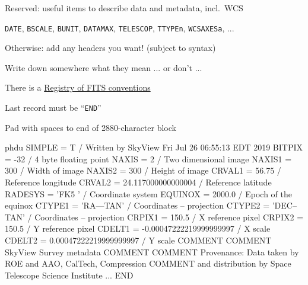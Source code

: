 \documentclass[20pt,landscape]{foils}
\newcommand{\bhref}[2]{\href{#1}{{\color{blue}#2}}}
\begin{document}
\begin{list0}
\begin{list2big}
\begin{list3}
      \item Reserved: useful items to describe data and metadata, incl.\ WCS
      \begin{list4}
        \item[] {\color{brown}\tt DATE},
                {\color{brown}\tt BSCALE},
                {\color{brown}\tt BUNIT},
                {\color{brown}\tt DATAMAX},
                {\color{brown}\tt TELESCOP},
                {\color{brown}\tt TTYPEn},
                {\color{brown}\tt WCSAXESa}, ...
\vspace*{-0.15cm}
      \end{list4}
      \item Otherwise: add any headers you want! (subject to syntax)
      \begin{list4}
        \item Write down somewhere what they mean ... or don't ...
        \item There is a
              \bhref{https://fits.gsfc.nasa.gov/fits_conventions.html}
                    {Registry of FITS conventions}
\vspace*{-0.15cm}
      \end{list4}
\vspace*{-0.15cm}
    \end{list3}
\vspace*{-0.15cm}
    \item Last record must be ``{\color{brown}\tt END}''
\vspace*{-0.15cm}
    \item Pad with spaces to end of 2880-character block
\vspace*{-0.15cm}
  \end{list2big}
\end{list0}

\newcommand{\g}{\color{darkgreen}}


\begin{SaveVerbatim}[commandchars=\\\{\}]{phdu}
\g SIMPLE  =                    T / Written by SkyView Fri Jul 26 06:55:13 EDT 2019
\g BITPIX  =                  -32 / 4 byte floating point
\g NAXIS   =                    2 / Two dimensional image
\g NAXIS1  =                  300 / Width of image
\g NAXIS2  =                  300 / Height of image
 CRVAL1  =                56.75 / Reference longitude
 CRVAL2  =   24.117000000000004 / Reference latitude
 RADESYS = 'FK5     '           / Coordinate system
 EQUINOX =               2000.0 / Epoch of the equinox
 CTYPE1  = 'RA---TAN'           / Coordinates -- projection
 CTYPE2  = 'DEC--TAN'           / Coordinates -- projection
 CRPIX1  =                150.5 / X reference pixel
 CRPIX2  =                150.5 / Y reference pixel
 CDELT1  = -0.00047222219999999997 / X scale
 CDELT2  = 0.00047222219999999997 / Y scale
 COMMENT
 COMMENT SkyView Survey metadata
 COMMENT
 COMMENT Provenance:  Data taken by ROE and AAO, CalTech, Compression
 COMMENT              and distribution by Space Telescope Science Institute
 ...
\g END
\end{SaveVerbatim}
\end{document}
